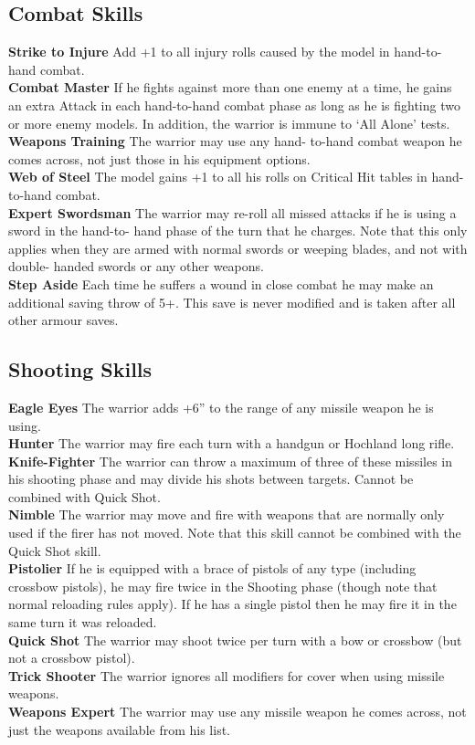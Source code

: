 \subsection*{Combat Skills}
\textbf{Strike to Injure} Add +1 to all injury rolls caused
by the model in hand-to-hand combat. \\
\textbf{Combat Master} If he fights against more than one
enemy at a time, he gains an extra Attack in each
hand-to-hand combat phase as long as he is fighting
two or more enemy models. In addition, the warrior
is immune to ‘All Alone’ tests. \\
\textbf{Weapons Training} The warrior may use any hand-
to-hand combat weapon he comes across, not just
those in his equipment options.\\
\textbf{Web of Steel} The model gains +1 to all his rolls on
Critical Hit tables in hand-to-hand combat. \\
\textbf{Expert Swordsman} The warrior may re-roll all
missed attacks if he is using a sword in the hand-to-
hand phase of the turn that he charges. Note that this
only applies when they are armed with normal
swords or weeping blades, and not with double-
handed swords or any other weapons. \\
\textbf{Step Aside} Each time he suffers a wound in close
combat he may make an additional saving throw of
5+. This save is never modified and is taken after all
other armour saves.
\subsection*{Shooting Skills}
\textbf{Eagle Eyes} The warrior adds +6” to the range of any missile weapon he is using. \\
\textbf{Hunter} The warrior may fire each turn with a handgun or Hochland long rifle. \\
\textbf{Knife-Fighter} The warrior can throw a maximum of three of these missiles in his shooting phase and may divide his shots between targets. Cannot be combined with Quick Shot. \\
\textbf{Nimble} The warrior may move and fire with weapons that are normally only used if the firer has not moved. Note that this skill cannot be combined with the Quick Shot skill. \\
\textbf{Pistolier} If he is equipped with a brace of pistols of any type (including crossbow pistols), he may fire twice in the Shooting phase (though note that normal reloading rules apply). If he has a single pistol then he may fire it in the same turn it was reloaded. \\
\textbf{Quick Shot} The warrior may shoot twice per turn with a bow or crossbow (but not a crossbow pistol). \\
\textbf{Trick Shooter} The warrior ignores all modifiers for cover when using missile weapons. \\
\textbf{Weapons Expert} The warrior may use any missile weapon he comes across, not just the weapons available from his list.
